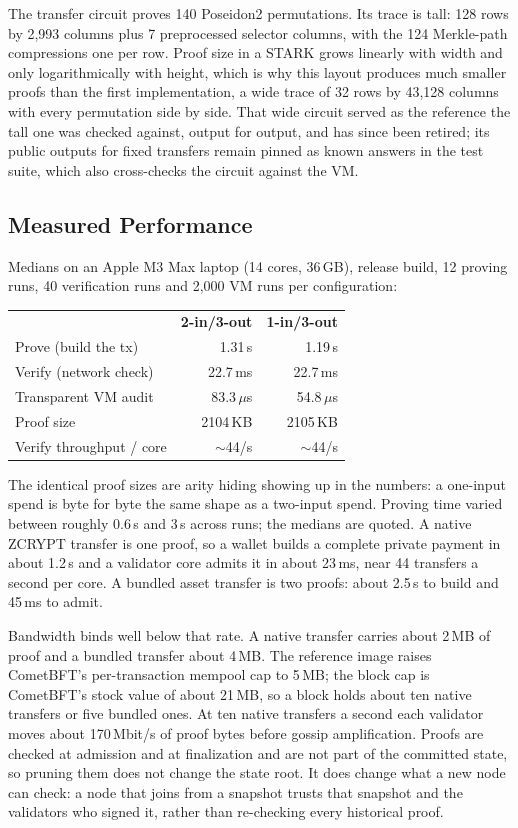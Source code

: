 \documentclass[twocolumn,10pt]{article}
\begin{document}
The transfer circuit proves 140 Poseidon2 permutations. Its trace is tall: 128 rows by 2,993 columns plus 7 preprocessed selector columns, with the 124 Merkle-path compressions one per row. Proof size in a STARK grows linearly with width and only logarithmically with height, which is why this layout produces much smaller proofs than the first implementation, a wide trace of 32 rows by 43,128 columns with every permutation side by side. That wide circuit served as the reference the tall one was checked against, output for output, and has since been retired; its public outputs for fixed transfers remain pinned as known answers in the test suite, which also cross-checks the circuit against the VM.

\subsection{Measured Performance}
\label{sec:perf}

Medians on an Apple M3 Max laptop (14 cores, 36\,GB), release build, 12 proving runs, 40 verification runs and 2,000 VM runs per configuration:

\begin{center}
\small
\begin{tabular}{lrr}
 & \textbf{2-in/3-out} & \textbf{1-in/3-out} \\
Prove (build the tx) & 1.31\,s & 1.19\,s \\
Verify (network check) & 22.7\,ms & 22.7\,ms \\
Transparent VM audit & 83.3\,$\mu$s & 54.8\,$\mu$s \\
Proof size & 2104\,KB & 2105\,KB \\
Verify throughput / core & $\sim$44/s & $\sim$44/s \\
\end{tabular}
\end{center}

The identical proof sizes are arity hiding showing up in the numbers: a one-input spend is byte for byte the same shape as a two-input spend. Proving time varied between roughly 0.6\,s and 3\,s across runs; the medians are quoted. A native ZCRYPT transfer is one proof, so a wallet builds a complete private payment in about 1.2\,s and a validator core admits it in about 23\,ms, near 44 transfers a second per core. A bundled asset transfer is two proofs: about 2.5\,s to build and 45\,ms to admit.

Bandwidth binds well below that rate. A native transfer carries about 2\,MB of proof and a bundled transfer about 4\,MB. The reference image raises CometBFT's per-transaction mempool cap to 5\,MB; the block cap is CometBFT's stock value of about 21\,MB, so a block holds about ten native transfers or five bundled ones. At ten native transfers a second each validator moves about 170\,Mbit/s of proof bytes before gossip amplification. Proofs are checked at admission and at finalization and are not part of the committed state, so pruning them does not change the state root. It does change what a new node can check: a node that joins from a snapshot trusts that snapshot and the validators who signed it, rather than re-checking every historical proof.
\end{document}
